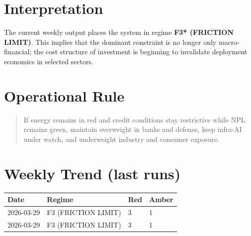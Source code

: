 \documentclass[11pt,a4paper]{article}
\begin{document}
\section*{Interpretation}
The current weekly output places the system in regime \textbf{F3* (FRICTION LIMIT)}. This implies that the dominant constraint is no longer only macro-financial; the cost structure of investment is beginning to invalidate deployment economics in selected sectors.

\section*{Operational Rule}
\begin{quote}
If energy remains in red and credit conditions stay restrictive while NPL remains green, maintain overweight in banks and defense, keep infra-AI under watch, and underweight industry and consumer exposure.
\end{quote}

\section*{Weekly Trend (last runs)}
\begin{longtable}{>{\small}p{3.2cm}>{\small}p{4.5cm}>{\small}p{1.2cm}>{\small}p{1.2cm}}
\toprule
Date & Regime & Red & Amber \\
\midrule
2026-03-29 & F3\textasteriskcentered{} (FRICTION LIMIT) & 3 & 1 \\
2026-03-29 & F3\textasteriskcentered{} (FRICTION LIMIT) & 3 & 1 \\
\bottomrule
\end{longtable}
\end{document}
